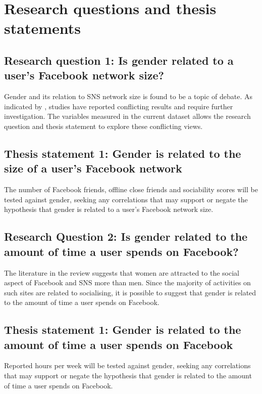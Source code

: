 \section{Research questions and thesis statements}

\subsection{Research question 1: Is gender related to a user's Facebook network size?}

Gender and its relation to SNS network size is found to be a topic of debate. As indicated by \citet{Tifferet2014}, studies have reported conflicting results and require further investigation. The variables measured in the current dataset allows the research question and thesis statement to explore these conflicting views.

\subsection{Thesis statement 1: Gender is related to the size of a user's Facebook network}

The number of Facebook friends, offline close friends and sociability scores will be tested against gender, seeking any correlations that may support or negate the hypothesis that gender is related to a user's Facebook network size. 

\subsection{Research Question 2: Is gender related to the amount of time a user spends on Facebook?}

The literature in the review suggests that women are attracted to the social aspect of Facebook and SNS more than men. Since the majority of activities on such sites are related to socialising, it is possible to suggest that gender is related to the amount of time a user spends on Facebook.

\subsection{Thesis statement 1: Gender is related to the amount of time a user spends on Facebook}

Reported hours per week will be tested against gender, seeking any correlations that may support or negate the hypothesis that gender is related to the amount of time a user spends on Facebook.